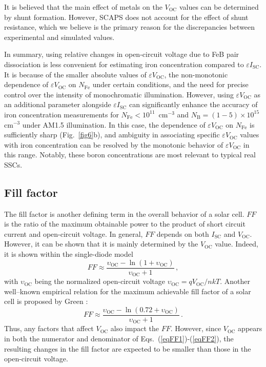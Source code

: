 \documentclass[a4paper,fleqn]{cas-sc}
\begin{document}
It is believed \cite{YangHandbookPVSi} that the main effect of metals on the $V_\mathrm{OC}$ values can be determined by shunt formation.
However, SCAPS does not account for the effect of shunt resistance,
which we believe is the primary reason for the discrepancies between experimental and simulated values.

In summary, using relative changes in open-circuit voltage due to FeB pair dissociation is less convenient
for estimating iron concentration compared to $\varepsilon I_\mathrm{SC}$.
It is because of the smaller absolute values of $\varepsilon V_\mathrm{OC}$,
the non-monotonic dependence of $\varepsilon V_\mathrm{OC}$ on $N_\mathrm{Fe}$ under certain conditions,
and the need for precise control over the intensity of monochromatic illumination.
However, using $\varepsilon V_\mathrm{OC}$ as an additional parameter alongside $\varepsilon I_\mathrm{SC}$
can significantly enhance the accuracy of iron concentration measurements for $N_\mathrm{Fe}<10^{11}$~cm$^{-3}$
and $N_\mathrm{B}=(1-5)\times10^{15}$cm$^{-3}$ under AM1.5 illumination.
In this case, the dependence of $\varepsilon V_\mathrm{OC}$ on $N_\mathrm{Fe}$ is sufficiently sharp (Fig.~\ref{fig6}b),
and ambiguity in associating specific $\varepsilon V_\mathrm{OC}$ values with iron concentration can be resolved
by the monotonic behavior of $\varepsilon V_\mathrm{OC}$ in this range.
Notably, these boron concentrations are most relevant to typical real SSCs.



\subsection{Fill factor}
The fill factor is another defining term in the overall behavior of a solar cell.
$F\!F$ is the ratio of the maximum obtainable power to the product of short circuit current and open-circuit voltage.
In general, $F\!F$ depends on both $I_\mathrm{SC}$ and $V_\mathrm{OC}$.
However, it can be shown that it is mainly determined by the $V_\mathrm{OC}$ value.
Indeed, it is shown \cite{YangHandbookPVSi} within the single-diode model
\begin{equation}
\label{eqFF1}
    F\!F \approx \frac{\upsilon_\mathrm{OC}-\ln\left(1+\upsilon_\mathrm{OC}\right)}{\upsilon_\mathrm{OC}+1} \,,
\end{equation}
with $\upsilon_\mathrm{OC}$ being the normalized open-circuit voltage
$\upsilon_\mathrm{OC}=qV_\mathrm{OC}/nkT$.
Another well--known empirical relation for the maximum achievable fill factor of a solar cell is proposed by Green \cite{Green1981,Green1982}:
\begin{equation}
\label{eqFF2}
    F\!F \approx \frac{\upsilon_\mathrm{OC}-\ln\left(0.72+\upsilon_\mathrm{OC}\right)}{\upsilon_\mathrm{OC}+1} \,.
\end{equation}
Thus, any factors that affect $V_\mathrm{OC}$ also impact the $F\!F$.
However, since $V_\mathrm{OC}$ appears in both the numerator and denominator of Eqs.~(\ref{eqFF1})-(\ref{eqFF2}),
the resulting changes in the fill factor are expected to be smaller than those in the open-circuit voltage.
\end{document}
